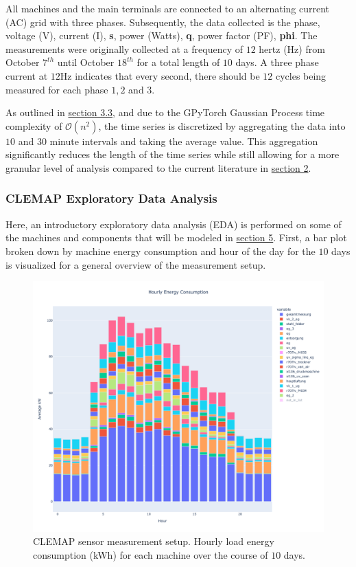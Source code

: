 All machines and the main terminals are connected to an alternating current (AC) grid with three phases. Subsequently, the data collected is the phase, voltage (V), current (I), \textbf{s}, power (Watts), \textbf{q}, power factor (PF), \textbf{phi}. The measurements were originally collected at a frequency of $12$ hertz (Hz) from October $7^{th}$ until October $18^{th}$ for a total length of $10$ days. A three phase current at $12$Hz indicates that every second, there should be $12$ cycles being measured for each phase $1, 2$ and $3$. 

As outlined in \hyperlink{subsection.3.3}{section 3.3}, and due to the GPyTorch Gaussian Process time complexity of $\mathcal{O}(n^2)$, the time series is discretized by aggregating the data into $10$ and $30$ minute intervals and taking the average value. This aggregation significantly reduces the length of the time series while still allowing for a more granular level of analysis compared to the current literature in \hyperlink{subsection.2}{section 2}.

\subsubsection{CLEMAP Exploratory Data Analysis}

Here, an introductory exploratory data analysis (EDA) is performed on some of the machines and components that will be modeled in \hyperlink{subsection.5}{section 5}. First, a bar plot broken down by machine energy consumption and hour of the day for the $10$ days is visualized for a general overview of the measurement setup.

\begin{figure}[htp]
\centering
\graphicspath{ {./images/} }
\includegraphics[scale=0.41]{images/hourly_load_barplot.png}
\caption{CLEMAP sensor measurement setup. Hourly load energy consumption (kWh) for each machine over the course of $10$ days.}
\end{figure}

